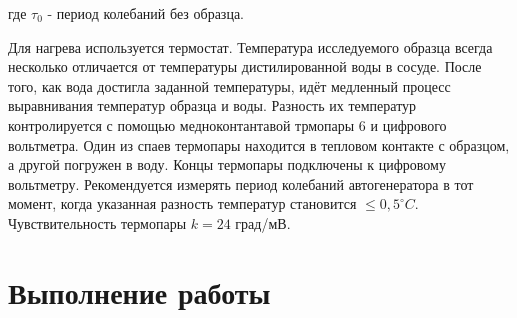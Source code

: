\documentclass[a4paper, 12pt]{article}%
\begin{document}
где $\tau_0$ - период колебаний без образца.

\vspace{0.5cm}

Для нагрева используется термостат. Температура исследуемого образца всегда несколько отличается от температуры дистилированной воды в сосуде. После того, как вода достигла заданной температуры, идёт медленный процесс выравнивания температур образца и воды. Разность их температур контролируется с помощью медноконтантавой трмопары 6 и цифрового вольтметра. Один из спаев термопары находится в тепловом контакте с образцом, а другой погружен в воду. Концы термопары подключены к цифровому вольтметру. Рекомендуется измерять период колебаний автогенератора в тот момент, когда указанная разность температур становится $\leq 0,5^{\circ} C$. Чувствительность термопары $k = 24$ град/мВ.

\section*{Выполнение работы}
\end{document}
